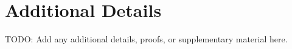 \appendix

\section{Additional Details}
\label{sec:appendix}

TODO: Add any additional details, proofs, or supplementary material here.